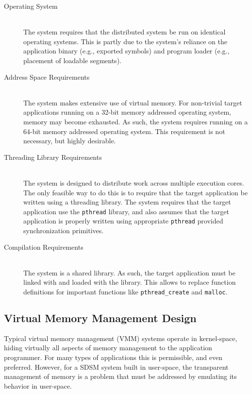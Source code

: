 \begin{description}
\item[Operating System] \hfill \\
The \projname{} system requires that the distributed system be run on identical operating systems.  This is partly due to the system's reliance on the application binary (e.g., exported symbols) and program loader (e.g., placement of loadable segments). 

\item[Address Space Requirements] \hfill \\
The \projname{} system makes extensive use of virtual memory.  For non-trivial target applications running on a 32-bit memory addressed operating system, memory may become exhausted.  As such, the \projname{} system requires running on a 64-bit memory addressed operating system.  This requirement is not necessary, but highly desirable.

\item[Threading Library Requirements] \hfill \\
 The \projname{} system is designed to distribute work across multiple execution cores.  The only feasible way to do this is to require that the target application be written using a threading library.  The \projname{} system requires that the target application use the \verb,pthread, library, and also assumes that the target application is properly written using appropriate \verb,pthread, provided synchronization primitives.

\item[Compilation Requirements] \hfill \\
The \projname{} system is a shared library.  As such, the target application must be linked with and loaded with the \projname{} library.  This allows \projname{} to replace function definitions for important functions like \verb,pthread_create, and \verb,malloc,.
\end{description}


\subsection{Virtual Memory Management Design}

Typical virtual memory management (VMM) systems operate in kernel-space, hiding virtually all aspects of memory management to the application programmer.  For many types of applications this is permissible, and even preferred.  However, for a SDSM system built in user-space, the transparent management of memory is a problem that must be addressed by emulating its behavior in user-space.

